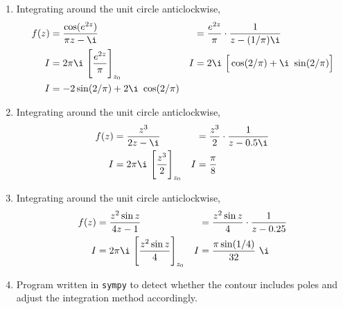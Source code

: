 \begin{enumerate}
    \item Integrating around the unit circle anticlockwise,
          \begin{align}
              f(z) & = \frac{\cos(e^{2z})}{\pi z - \i}                   &
                   & = \frac{e^{2z}}{\pi} \cdot \frac{1}{z - (1/\pi) \i}   \\
              I    & = 2\pi \i\ \Bigg[ \frac{e^{2z}}{\pi} \Bigg]_{z_0}   &
              I    & = 2\i\ \Big[\cos(2/\pi) + \i\ \sin(2/\pi)\Big]        \\
              I    & = -2 \sin(2/\pi) + 2\i\ \cos(2/\pi)
          \end{align}

    \item Integrating around the unit circle anticlockwise,
          \begin{align}
              f(z) & = \frac{z^3}{2 z - \i}                       &
                   & = \frac{z^3}{2} \cdot \frac{1}{z - 0.5\i}      \\
              I    & = 2\pi \i\ \Bigg[ \frac{z^3}{2} \Bigg]_{z_0} &
              I    & = \frac{\pi}{8}
          \end{align}

    \item Integrating around the unit circle anticlockwise,
          \begin{align}
              f(z) & = \frac{z^2 \sin z}{4z - 1}                         &
                   & = \frac{z^2 \sin z}{4} \cdot \frac{1}{z - 0.25}       \\
              I    & = 2\pi \i\ \Bigg[ \frac{z^2 \sin z}{4} \Bigg]_{z_0} &
              I    & = \frac{\pi \sin(1/4)}{32}\ \i
          \end{align}

    \item Program written in \texttt{sympy} to detect whether the contour includes
          poles and adjust the integration method accordingly.


\end{enumerate}

